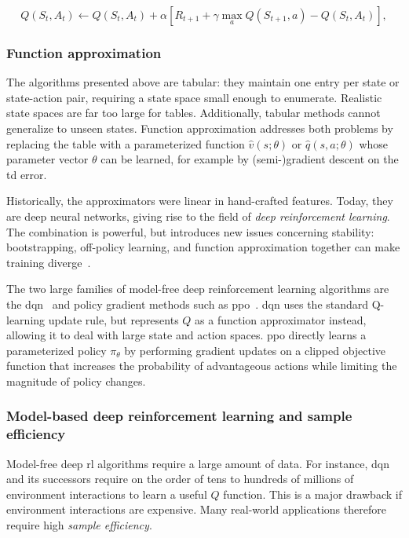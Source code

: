 \begin{equation}\label{eq:q-learning}
  Q(S_t,A_t)\leftarrow Q(S_t,A_t)+\alpha\left[R_{t+1}+\gamma\max_{a}Q(S_{t+1},a)-Q(S_t,A_t)\right],
\end{equation}

\subsubsection{Function approximation}\label{sec:rl-fa}

The algorithms presented above are tabular: they maintain one entry per state or state-action pair,
requiring a state space small enough to enumerate.
Realistic state spaces are far too large for tables.
Additionally, tabular methods cannot generalize to unseen states.
Function approximation addresses both problems by replacing the table with a parameterized
function $\hat{v}(s;\theta)$ or $\hat{q}(s,a;\theta)$ whose parameter vector $\theta$
can be learned, for example by (semi-)gradient descent on the \gls{td} error.

Historically, the approximators were linear in hand-crafted features.
Today, they are deep neural networks, giving rise to the field of \emph{deep reinforcement learning}.
The combination is powerful, but introduces new issues concerning stability:
bootstrapping, off-policy learning, and function approximation together can
make training diverge~\cite{sutton_reinforcement_2020}.

The two large families of model-free deep reinforcement learning algorithms are
the \gls{dqn}~\cite{mnih_human-level_2015} and policy gradient
methods such as
\gls{ppo}~\cite{schulman_proximal_2017}. \Gls{dqn} uses the standard Q-learning update
rule, but represents $Q$ as a function approximator instead, allowing it to
deal with large state and action spaces. \gls{ppo} directly learns a parameterized
policy $\pi_\theta$ by performing gradient updates on a clipped objective
function that increases the probability of advantageous actions while limiting
the magnitude of policy changes.

\subsubsection{Model-based deep reinforcement learning and sample efficiency}\label{sec:rl-sample-efficiency}

Model-free deep \gls{rl} algorithms require a large amount of data.
For instance, \gls{dqn} and its successors require on the order of tens to hundreds
of millions of environment interactions to learn a useful $Q$ function.
This is a major drawback if environment interactions are expensive.
Many real-world applications therefore require high \emph{sample efficiency}.

